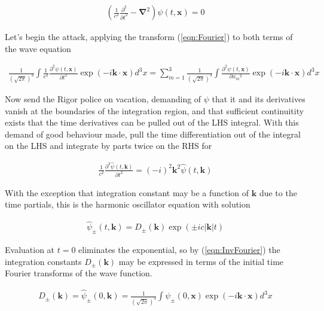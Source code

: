 \documentclass[]{eliblog}
\newcommand{\Abs}[1]{{\left\lvert{#1}\right\rvert}}
\newcommand{\Bk}[0]{\mathbf{k}}
\newcommand{\Bx}[0]{\mathbf{x}}
\newcommand{\spacegrad}[0]{\boldsymbol{\nabla}}
\newcommand{\delambertian}[0]{\square}
\newcommand{\inv}[1]{\frac{1}{#1}}
\newcommand{\kcap}[0]{\hat{\Bk}}
\begin{document}
\begin{align}\label{eqn:psiWave}
\left( \frac{1}{c^2}\frac{\partial^2}{{\partial t}^2} - \spacegrad^2 \right) \psi(t,\Bx) = 0
\end{align}

Let's begin the attack, applying the transform (\ref{eqn:Fourier}) to both terms of the wave equation

\begin{align}
\inv{(\sqrt{2\pi})^3} \int 
\inv{c^2} \frac{\partial^2 \psi(t,\Bx)}{\partial t^2}
\exp\left( -i \Bk \cdot \Bx \right) d^3 x 
=
\sum_{m=1}^3 \inv{(\sqrt{2\pi})^3} \int \frac{\partial^2 \psi(t, \Bx) }{\partial {x_m}^2} \exp\left( -i \Bk \cdot \Bx \right) d^3 x 
\end{align}

Now send the Rigor police on vacation, demanding of $\psi$ that it and its derivatives vanish at the boundaries of the integration region,
and that sufficient continuitity exists that the time derivatives can be pulled out of the LHS integral.  With this demand of good 
behaviour made, pull the time 
differentiation out of the integral on the LHS and integrate by parts twice on the RHS for

\begin{align}
\inv{c^2} \frac{\partial^2 \hat{\psi}(t,\Bk)}{\partial t^2} = (-i)^2 \Bk^2 \hat{\psi}(t,\Bk)
\end{align}

With the exception that integration constant may be a function of $\Bk$ due to the time partials, this is the 
harmonic oscillator equation with solution

\begin{align}\label{eqn:harmonicSolution}
\hat{\psi}_{\pm}(t,\Bk) = D_{\pm}(\Bk) \exp(\pm i c \Abs{\Bk} t)
\end{align}

Evaluation at $t=0$ eliminates the exponential, so by (\ref{eqn:InvFourier}) the 
integration constants $D_{\pm}(\Bk)$ may be expressed in terms of the initial time Fourier transforms of the wave function.

\begin{align}\label{eqn:integrationConst}
D_{\pm}(\Bk) = \hat{\psi}_{\pm}(0,\Bk) = \inv{(\sqrt{2\pi})^3} \int \psi_{\pm}(0,\Bx) \exp\left( -i \Bk \cdot \Bx \right) d^3 x 
\end{align}
\end{document}
